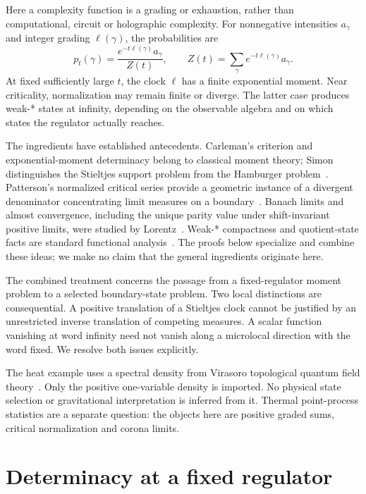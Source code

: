\documentclass[11pt]{article}
\theoremstyle{definition}
\begin{document}
Here a complexity function is a grading or exhaustion, rather than computational, circuit or holographic complexity.
For nonnegative intensities $a_\gamma$ and integer grading $\ell(\gamma)$, the probabilities are
\begin{equation}
 p_t(\gamma)=\frac{e^{-t\ell(\gamma)}a_\gamma}{Z(t)},
 \qquad Z(t)=\sum_\gamma e^{-t\ell(\gamma)}a_\gamma.
 \label{eq:sector-start}
\end{equation}
At fixed sufficiently large $t$, the clock $\ell$ has a finite exponential moment.
Near criticality, normalization may remain finite or diverge.
The latter case produces weak-* states at infinity, depending on the observable algebra and on which states the regulator actually reaches.

The ingredients have established antecedents.
Carleman's criterion and exponential-moment determinacy belong to classical moment theory; Simon distinguishes the Stieltjes support problem from the Hamburger problem~\cite{Simon1998}.
Patterson's normalized critical series provide a geometric instance of a divergent denominator concentrating limit measures on a boundary~\cite{Patterson1976}.
Banach limits and almost convergence, including the unique parity value under shift-invariant positive limits, were studied by Lorentz~\cite{Lorentz1948}.
Weak-* compactness and quotient-state facts are standard functional analysis~\cite{Alaoglu1940,Murphy1990}.
The proofs below specialize and combine these ideas; we make no claim that the general ingredients originate here.

The combined treatment concerns the passage from a fixed-regulator moment problem to a selected boundary-state problem.
Two local distinctions are consequential.
A positive translation of a Stieltjes clock cannot be justified by an unrestricted inverse translation of competing measures.
A scalar function vanishing at word infinity need not vanish along a microlocal direction with the word fixed.
We resolve both issues explicitly.

The heat example uses a spectral density from Virasoro topological quantum field theory~\cite{CollierEberhardtZhang2023}.
Only the positive one-variable density is imported.
No physical state selection or gravitational interpretation is inferred from it.
Thermal point-process statistics are a separate question: the objects here are positive graded sums, critical normalization and corona limits.

\section{Determinacy at a fixed regulator}
\label{sec:determinacy}
\end{document}
